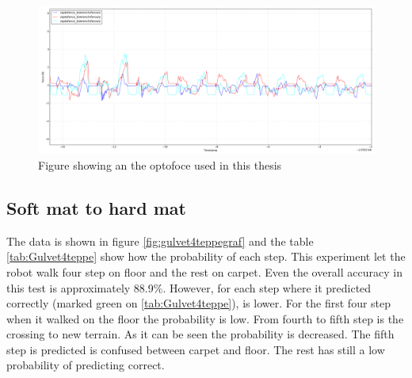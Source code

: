 \documentclass[USenglish]{ifimaster}  %
\begin{document}
\begin{figure}[h]
    \centering
    \includegraphics[width=\textwidth,height=\textheight,keepaspectratio]{Figures/MB3MM}
    \caption{Figure showing an the optofoce used in this thesis \cite{OptoforceFig}}
    \label{fig:optoforce}
\end{figure}
\begin{table}[h]
\centering
{}
\caption{Hard matte 3 myk matte}
\label{my-label}
\end{table}
\FloatBarrier

\subsection{Soft mat to hard mat}
The data is shown in figure \ref{fig:gulvet4teppegraf} and the table \ref{tab:Gulvet4teppe} show how the probability of each step. This experiment let the robot walk four step on floor and the rest on carpet. Even the overall accuracy in this test is approximately 88.9\%. However, for each step where it predicted correctly (marked green on \ref{tab:Gulvet4teppe}), is lower. For the first four step when it walked on the floor the probability is low. From fourth to fifth step is the crossing to new terrain. As it can be seen the probability is decreased. The fifth step is predicted is confused between carpet and floor. The rest has still a low probability of predicting correct.
\end{document}
